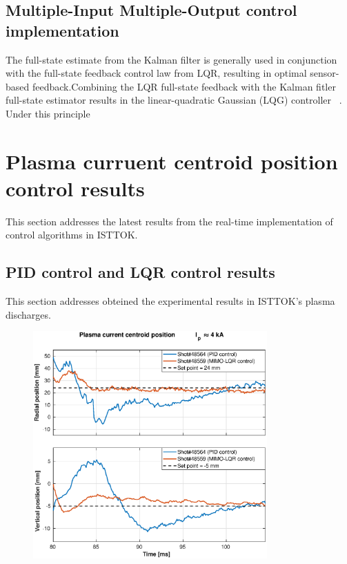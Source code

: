 \subsection{Multiple-Input Multiple-Output control implementation}
	
The full-state estimate from the Kalman filter is generally used in conjunction with the
full-state feedback control law from LQR, resulting in optimal sensor-based feedback.Combining the LQR full-state feedback with the Kalman fitler full-state estimator results in the linear-quadratic Gaussian (LQG) controller ~\cite[Chapter~8]{DataDriven2019}. Under this principle 
\smallskip



\section{Plasma curruent centroid position control results}

This section addresses the latest results from the real-time implementation of control algorithms in ISTTOK. 

\subsection{PID control and LQR control results}

This section addresses obteined the experimental results in ISTTOK's plasma discharges.

\begin{figure}
	\centering
	\includegraphics[width=0.8\textwidth]{Chp5/PIDvsMIMO_564_559_2.eps}
	\label{564_559}
\end{figure}

